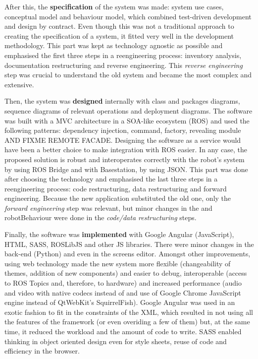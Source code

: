 After this, the \textbf{specification} of the system was made: system use cases, conceptual model and behaviour model, which combined test-driven development and design by contract.
Even though this was not a traditional approach to creating the specification of a system, it fitted very well in the development methodology.
This part was kept as technology agnostic as possible and emphasised the first three steps in a reengineering process: inventory analysis, documentation restructuring and reverse engineering.
This \emph{reverse engineering} step was crucial to understand the old system and became the most complex and extensive.

Then, the system was \textbf{designed} internally with class and packages diagrams, sequence diagrams of relevant operations and deployment diagrams.
The software was built with a \ac{MVC} architecture in a SOA-like ecosystem (ROS) and used the following patterns: dependency injection, command, factory, revealing module AND FIXME REMOTE FACADE.
Designing the software as a service would have been a better choice to make integration with ROS easier.
In any case, the proposed solution is robust and interoperates correctly with the robot's system by using ROS Bridge and with Basestation, by using JSON.
This part was done after choosing the technology and emphasised the last three steps in a reengineering process: code restructuring, data restructuring and forward engineering.
Because the new application substituted the old one, only the \emph{forward engineering} step was relevant, but minor changes in the \flangobe and robotBehaviour were done in the \emph{code/data restructuring} steps.

Finally, the software was \textbf{implemented} with Google Angular (JavaScript), HTML, SASS, ROSLibJS and other JS libraries.
There were minor changes in the back-end (Python) and even in the screens editor.
Amongst other improvements, using web technology made the new system more flexible (changeability of themes, addition of new components) and easier to debug, interoperable (access to ROS Topics and, therefore, to hardware) and increased performance (audio and video with native codecs instead of \flash and use of Google Chrome JavaScript engine instead of QtWebKit's SquirrelFish).
Google Angular was used in an exotic fashion to fit in the constraints of the \ac{XML}, which resulted in not using all the features of the framework (or even overiding a few of them) but, at the same time, it reduced the workload and the amount of code to write.
SASS enabled thinking in object oriented design even for style sheets, reuse of code and efficiency in the browser.

